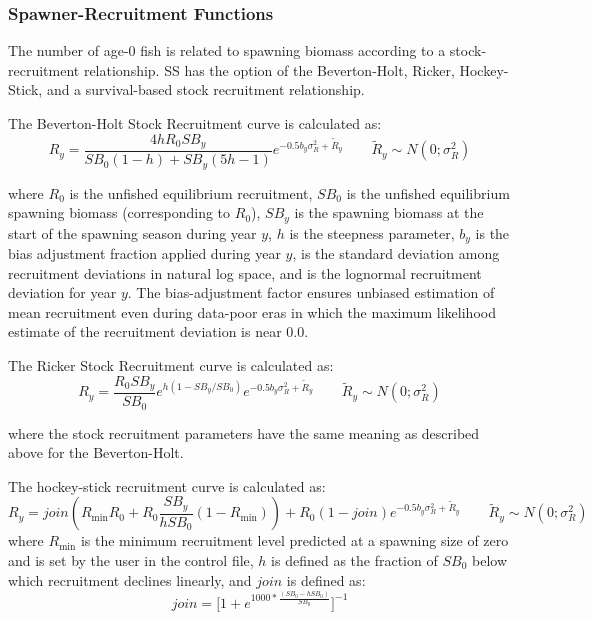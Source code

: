 \subsubsection{Spawner-Recruitment Functions}
The number of age-0 fish is related to spawning biomass according to a stock-recruitment relationship.  SS has the option of the Beverton-Holt, Ricker, Hockey-Stick, and a survival-based stock recruitment relationship.

\hypertarget{BH}{}
The Beverton-Holt Stock Recruitment curve is calculated as:
\begin{equation}{R_y = \frac{4hR_0SB_y}{SB_0(1-h)+SB_y(5h-1)}e^{-0.5b_y\sigma^2_R+\tilde{R}_y}\qquad  \tilde{R}_y\sim N(0;\sigma^2_R)}
\end{equation}

where $R_0$ is the unfished equilibrium recruitment, $SB_0$ is the unfished equilibrium spawning biomass (corresponding to $R_0$), $SB_y$ is the spawning biomass at the start of the spawning season during year $y$, $h$ is the steepness parameter, $b_y$ is the bias adjustment fraction applied during year $y$, is the standard deviation among recruitment deviations in natural log space, and is the lognormal recruitment deviation for year $y$. The bias-adjustment factor \citep{methot_adjusting_2011} ensures unbiased estimation of mean recruitment even during data-poor eras in which the maximum likelihood estimate of the recruitment deviation is near 0.0.

\hypertarget{Ricker}{}
The Ricker Stock Recruitment curve is calculated as:
\begin{equation}{R_y = \frac{R_0SB_y}{SB_0}e^{h(1-SB_y/SB_0)}e^{-0.5b_y\sigma^2_R+\tilde{R}_y}\qquad  \tilde{R}_y\sim N(0;\sigma^2_R)}
\end{equation}

where the stock recruitment parameters have the same meaning as described above for the Beverton-Holt.

\hypertarget{Hockey}{}
The hockey-stick recruitment curve is calculated as:
\begin{equation}{R_y = join(R_{\text{min}}R_0+R_0\frac{SB_y}{hSB_0}(1-R_{\text{min}}))+R_0(1-join)e^{-0.5b_y\sigma^2_R+\tilde{R}_y}\qquad  \tilde{R}_y\sim N(0;\sigma^2_R)}\end{equation}
where $R_{\text{min}}$ is the minimum recruitment level predicted at a spawning size of zero and is set by the user in the control file, $h$ is defined as the fraction of $SB_0$ below which recruitment declines linearly, and $join$ is defined as:
\begin{equation}{ join = \bigg[1+e^{1000*\frac{(SB_0-hSB_0)}{SB_0}}\bigg]^{-1} } \end{equation}


